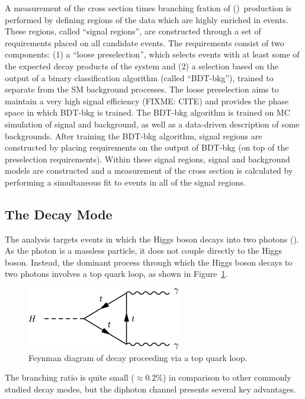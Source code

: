 A measurement of the cross section times branching fration of \ttH (\Hgg)~production is performed by defining regions of the data which are highly enriched in \ttH events. These regions, called ``signal regions'', are constructed through a set of requirements placed on all candidate events. 
The requirements consist of two components: 
(1) a ``loose preselection'', which selects events with at least some of the expected decay products of the \ttH system and 
(2) a selection based on the output of a binary classification algorithm (called ``BDT-bkg''), trained to separate \ttH from the SM background processes. The loose preselection aims to maintain a very high signal efficiency (FIXME: CITE) and provides the phase space in which BDT-bkg is trained.
The BDT-bkg algorithm is trained on MC simulation of signal and background, as well as a data-driven description of some backgrounds. After training the BDT-bkg algorithm, signal regions are constructed by placing requirements on the output of BDT-bkg (on top of the preselection requirements).
Within these signal regions, signal and background models are constructed and a measurement of the \ttH cross section is calculated by performing a simultaneous fit to events in all of the signal regions. 
%
\subsection{The \Hgg Decay Mode}
The analysis targets \ttH events in which the Higgs boson decays into two photons (\Hgg). As the photon is a massless particle, it does not couple directly to the Higgs boson.
Instead, the dominant process through which the Higgs boson decays to two photons involves a top quark loop, as shown in Figure~\ref{fig:hgg_feynman}.
\begin{figure}[h!]
    \centering
    \includegraphics[width=0.6\textwidth]{figures/feynman_diagrams/hgg}
    \caption{Feynman diagram of \Hgg decay proceeding via a top quark loop.}
    \label{fig:hgg_feynman}
\end{figure}
The \Hgg branching ratio is quite small ($\approx 0.2\%$) in comparison to other commonly studied decay modes, but the diphoton channel presents several key advantages.

